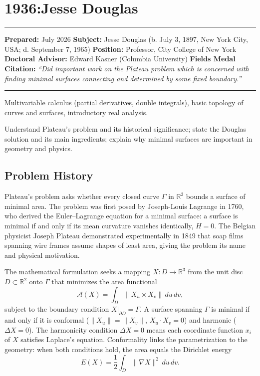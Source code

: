 \chapter{1936:Jesse Douglas}\label{ch1936jessedouglas:jesse-douglas-fields-medal-1936-a-comprehensive-report}

\begin{center}\rule{0.5\linewidth}{0.5pt}\end{center}

\textbf{Prepared:} July 2026 \textbf{Subject:} Jesse Douglas (b. July 3,
1897, New York City, USA; d. September 7, 1965) \textbf{Position:} Professor, City College of
New York \textbf{Doctoral Advisor:} Edward Kasner (Columbia University)
\textbf{Fields Medal Citation:} \emph{``Did important work on the
Plateau problem which is concerned with finding minimal surfaces
connecting and determined by some fixed boundary.''}

\begin{center}\rule{0.5\linewidth}{0.5pt}\end{center}

\begin{prereqs}
Multivariable calculus (partial derivatives, double integrals),
basic topology of curves and surfaces, introductory real analysis.
\end{prereqs}

\begin{objectives}
Understand Plateau's problem and its historical significance; state the
Douglas solution and its main ingredients; explain why minimal surfaces
are important in geometry and physics.
\end{objectives}

\section{Problem History}

Plateau's problem asks whether every closed curve $\Gamma$ in $\mathbb{R}^3$
bounds a surface of minimal area. The problem was first posed by
Joseph-Louis Lagrange in 1760, who derived the Euler--Lagrange equation
for a minimal surface: a surface is minimal if and only if its mean
curvature vanishes identically, $H = 0$. The Belgian physicist Joseph
Plateau demonstrated experimentally in 1849 that soap films spanning wire
frames assume shapes of least area, giving the problem its name and
physical motivation.

The mathematical formulation seeks a mapping $X: D \to \mathbb{R}^3$ from
the unit disc $D \subset \mathbb{R}^2$ onto $\Gamma$ that minimizes the
area functional
\[
\mathcal{A}(X) = \int_D \|X_u \times X_v\| \, du\,dv,
\]
subject to the boundary condition $X|_{\partial D} = \Gamma$. A surface
spanning $\Gamma$ is minimal if and only if it is conformal ($\|X_u\| =
\|X_v\|$, $X_u \cdot X_v = 0$) and harmonic ($\Delta X = 0$). The
harmonicity condition $\Delta X = 0$ means each coordinate function
$x_i$ of $X$ satisfies Laplace's equation. Conformality links the
parametrization to the geometry: when both conditions hold, the area
equals the Dirichlet energy
\[
E(X) = \frac{1}{2}\int_D \|\nabla X\|^2\,du\,dv.
\]

